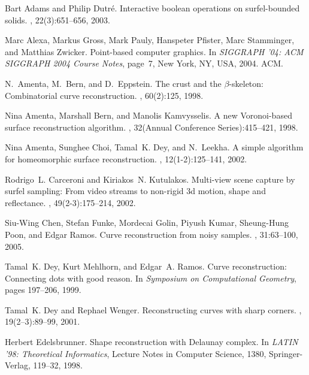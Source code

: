 \documentclass{article}
\numberwithin{cntr}{section}
\numberwithin{equation}{section}
\begin{document}

\begin{thebibliography}{99}

Bart Adams and Philip Dutr\'{e}.
\newblock Interactive boolean operations on surfel-bounded solids.
, 22(3):651--656, 2003.

Marc Alexa, Markus Gross, Mark Pauly, Hanspeter Pfister, Marc Stamminger, and
  Matthias Zwicker.
\newblock Point-based computer graphics.
\newblock In {\em SIGGRAPH '04: ACM SIGGRAPH 2004 Course Notes}, page~7, New
  York, NY, USA, 2004. ACM.

N.~Amenta, M.~Bern, and D.~Eppstein.
\newblock The crust and the $\beta$-skeleton: Combinatorial curve
  reconstruction.
, 60(2):125, 1998.

Nina Amenta, Marshall Bern, and Manolis Kamvysselis.
\newblock A new {Voronoi}-based surface reconstruction algorithm.
, 32({Annual Conference Series}):415--421,
  1998.

Nina Amenta, Sunghee Choi, Tamal~K. Dey, and N.~Leekha.
\newblock A simple algorithm for homeomorphic surface reconstruction.
, 12(1-2):125--141, 2002.

Rodrigo~L. Carceroni and Kiriakos~N. Kutulakos.
\newblock Multi-view scene capture by surfel sampling: From video streams to
  non-rigid 3d motion, shape and reflectance.
, 49(2-3):175--214, 2002.

Siu-Wing Chen, Stefan Funke, Mordecai Golin, Piyush Kumar,
Sheung-Hung Poon, and Edgar Ramos.
\newblock Curve reconstruction from noisy samples.
, 31:63--100, 2005.

Tamal~K. Dey, Kurt Mehlhorn, and Edgar~A. Ramos.
\newblock Curve reconstruction: Connecting dots with good reason.
\newblock In {\em Symposium on Computational Geometry}, pages 197--206, 1999.

Tamal~K. Dey and Rephael Wenger.
\newblock Reconstructing curves with sharp corners.
, 19(2--3):89--99, 2001.

Herbert Edelsbrunner.
\newblock Shape reconstruction with Delaunay complex.
\newblock In {\em LATIN '98: Theoretical Informatics}, Lecture Notes
in Computer Science, 1380, Springer-Verlag, 119--32, 1998.


\end{thebibliography}
\end{document}
